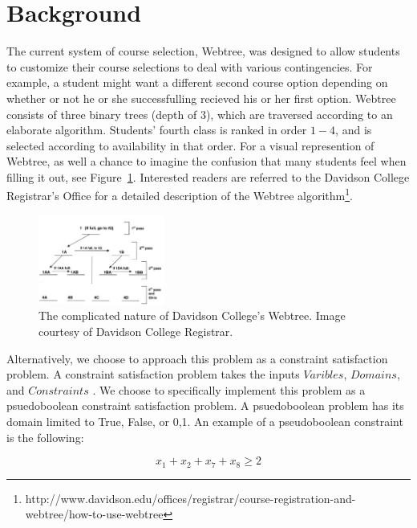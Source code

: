 
\section{Background}
\label{sec:background}

The current system of course selection, Webtree, was designed to allow
students to customize their course selections to deal with various
contingencies. For example, a student might want a different second
course option depending on whether or not he or she successfulling
recieved his or her first option. Webtree consists of three binary trees (depth
of $3$), which are traversed according to an elaborate
algorithm. Students' fourth class is ranked in order $1-4$, and is
selected according to availability in that order. For a visual
represention of Webtree, as well a chance to imagine the confusion that
many students feel when filling it out, see
Figure~\ref{fig:webtr}. Interested readers are referred to the
Davidson College Registrar's Office for a detailed description of the
Webtree algorithm\footnote{http://www.davidson.edu/offices/registrar/course-registration-and-webtree/how-to-use-webtree}.

\begin{figure}[htb]
  \centering  %
  \includegraphics[width=0.37\textwidth]{figs/webtree.jpg}
  \caption{The complicated nature of Davidson College's Webtree. Image
    courtesy of Davidson College Registrar.}
  \label{fig:webtr}
\end{figure}

Alternatively, we choose to approach this problem as a constraint
satisfaction problem. A constraint satisfaction problem takes the
inputs $Varibles$, $Domains$, and $Constraints$ \cite{aima}. We choose to
specifically implement this problem as a psuedoboolean constraint
satisfaction problem. A psuedoboolean problem has its domain limited
to {True, False}, or {0,1}. An example of a pseudoboolean constraint is the
following:

\begin{equation} x_1 + x_2 + x_7 + x_8 \geq 2 \end{equation}

